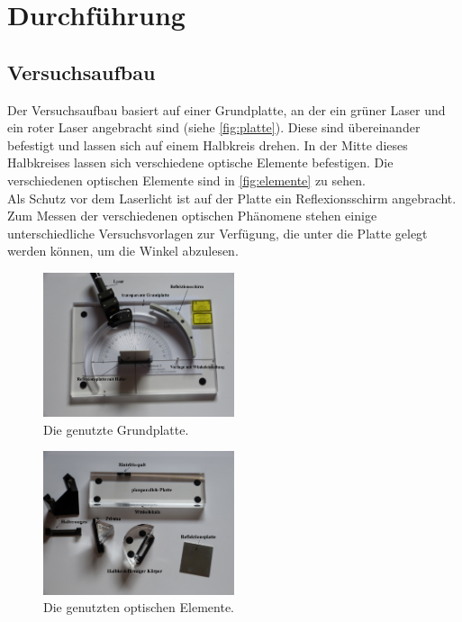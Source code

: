 \section{Durchführung}
\label{sec:Durchführung}
\subsection{Versuchsaufbau}
        
        Der Versuchsaufbau basiert auf einer Grundplatte, an der ein grüner Laser und ein roter Laser angebracht sind (siehe \autoref{fig:platte}). Diese sind übereinander befestigt und lassen sich auf einem Halbkreis drehen. In der Mitte dieses Halbkreises lassen sich 
        verschiedene optische Elemente befestigen. Die verschiedenen optischen Elemente sind in \autoref{fig:elemente} zu sehen.\\
        Als Schutz vor dem Laserlicht ist auf der Platte ein Reflexionsschirm angebracht. Zum Messen der verschiedenen optischen Phänomene stehen einige unterschiedliche Versuchsvorlagen zur Verfügung, die unter die Platte gelegt werden können, um die Winkel abzulesen.

        \begin{figure}[H]
            \centering
            \includegraphics[width=0.5\textwidth]{images/platte.PNG}
            \caption{Die genutzte Grundplatte. \cite{400}}
            \label{fig:platte}
        \end{figure}

        \begin{figure}[H]
            \centering
            \includegraphics[width=0.5\textwidth]{images/elemente.PNG}
            \caption{Die genutzten optischen Elemente. \cite{400}}
            \label{fig:elemente}
        \end{figure}
        
